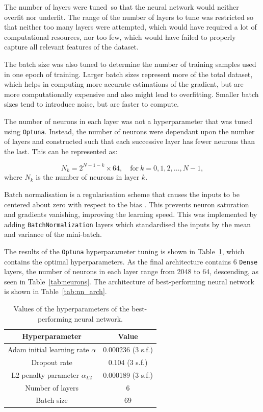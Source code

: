 \documentclass[11pt,a4paper]{article}
\begin{document}
The number of layers were tuned so that the neural network would neither overfit nor underfit. The range of the number of layers to tune was restricted so that neither too many layers were attempted, which would have required a lot of computational resources, nor too few, which would have failed to properly capture all relevant features of the dataset.

The batch size was also tuned to determine the number of training samples used in one epoch of training. Larger batch sizes represent more of the total dataset, which helps in computing more accurate estimations of the gradient, but are more computationally expensive and also might lead to overfitting. Smaller batch sizes tend to introduce noise, but are faster to compute.

The number of neurons in each layer was not a hyperparameter that was tuned using \texttt{Optuna}. Instead, the number of neurons were dependant upon the number of layers and constructed such that each successive layer has fewer neurons than the last. This can be represented as:

\begin{equation}
    N_k = 2^{N-1-k} \times 64, \quad\mathrm{for}\ k=0, 1, 2, \dots, N-1,
\end{equation}
where $N_k$ is the number of neurons in layer $k$.

Batch normalisation is a regularisation scheme that causes the inputs to be centered about zero with respect to the bias \citep{Mehta_2019}. This prevents neuron saturation and gradients vanishing, improving the learning speed. This was implemented by adding \texttt{BatchNormalization} layers which standardised the inputs by the mean and variance of the mini-batch.

The results of the \texttt{Optuna} hyperparameter tuning is shown in Table~\ref{tab:nn_hyperparameter}, which contains the optimal hyperparameters. As the final architecture contains 6 \texttt{Dense} layers, the number of neurons in each layer range from 2048 to 64, descending, as seen in Table~\ref{tab:neurons}. The architecture of  best-performing neural network is shown in Table~\ref{tab:nn_arch}.

\begin{table}[ht]
    \centering
    \begin{tabular}{c|c}
        Hyperparameter & Value\\
        \hline
        Adam initial learning rate $\alpha$ & 0.000236 (3 s.f.) \\
        Dropout rate & 0.104 (3 s.f.) \\
        L2 penalty parameter $\alpha_{L2}$ & 0.000189 (3 s.f.) \\
        Number of layers & 6 \\
        Batch size & 69 \\
    \end{tabular}
    \caption{Values of the hyperparameters of the best-performing neural network.}\label{tab:nn_hyperparameter}
\end{table}
\end{document}
